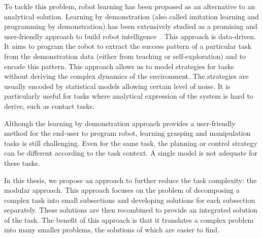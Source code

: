 To tackle this problem, robot learning has been proposed as an alternative to an analytical solution. Learning by demonstration (also called imitation learning and programming by demonstration) has been extensively studied as a promising and user-friendly approach to build robot intelligence~\citep{schaal2003computational,dillmann2004teaching,billard2006discriminative,calinon2007incremental}. This approach is data-driven. It aims to program the robot to extract the success pattern of a particular task from the demonstration data (either from teaching or self-exploration) and to encode this pattern. This approach allows us to model strategies for tasks without deriving the complex dynamics of the environment. The strategies are usually encoded by statistical models allowing certain level of noise. It is particularly useful for tasks where analytical expression of the system is hard to derive, such as contact tasks.


Although the learning by demonstration approach provides a user-friendly method for the end-user to program robot, learning grasping and manipulation tasks is still challenging. Even for the same task, the planning or control strategy can be different according to the task context. A single model is not adequate for these tasks.


In this thesis, we propose an approach to further reduce the task complexity: the modular approach.
This approach focuses on the problem of decomposing a complex task into small subsections and developing solutions for each subsection separately. These solutions are then recombined to provide an integrated solution of the task. The benefit of this approach is that it translates a complex problem into many smaller problems, the solutions of which are easier to find.

